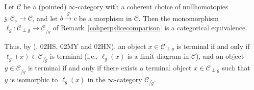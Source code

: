 \documentclass{tac}
\newcommand{\f}[1]{\mathfrak{#1}}
\newcommand{\s}[1]{\mathscr{#1}}
\begin{document}
\begin{proposition}\label{cohnultriangleprop} Let $\s{C}$ be a (pointed) $\infty$-category with a coherent choice of nullhomotopies $\f{z} : \s{C}_\diamond \to \s{C}$, and let $b\xrightarrow{g} c$ be a morphism in $\s{C}$.  Then the monomorphism $\ell_g : \s{C}_{\perp g} \to \s{C}_{/ \tilde{g}}$ of Remark~\ref{cohperpslicecomparison} is a categorical equivalence.  

Thus, by (\cite{kerodon}, 02HS, 02MY and 02HN), an object $x \in \s{C}_{\perp g}$ is terminal if and only if $\ell_g (x) \in \s{C}_{/ \tilde{g}}$ is terminal (i.e., $\ell_g (x)$ is a limit diagram in $\s{C}$), and an object $y \in  \s{C}_{/ \tilde{g}}$ is terminal if and only if there exists a terminal object $x \in \s{C}_{\perp g}$ such that $y$ is isomorphic to $\ell_g (x)$ in the $\infty$-category $\s{C}_{/ \tilde{g}}$.
\end{proposition}
\end{document}
